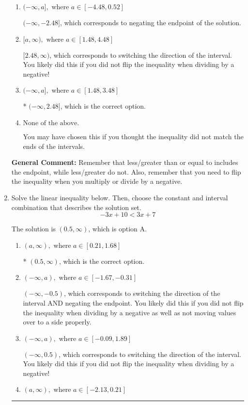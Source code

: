 \documentclass{extbook}[14pt]
\newcommand{\litem}[1]{\item #1

\rule{\textwidth}{0.4pt}}
\begin{document}
\begin{enumerate}
{\begin{enumerate}[label=\Alph*.]
 $[-2.48, \infty)$, which corresponds to switching the direction of the interval AND negating the endpoint. You likely did this if you did not flip the inequality when dividing by a negative as well as not moving values over to a side properly.
\item \( (-\infty, a], \text{ where } a \in [-4.48, 0.52] \)

 $(-\infty, -2.48]$, which corresponds to negating the endpoint of the solution.
\item \( [a, \infty), \text{ where } a \in [1.48, 4.48] \)

 $[2.48, \infty)$, which corresponds to switching the direction of the interval. You likely did this if you did not flip the inequality when dividing by a negative!
\item \( (-\infty, a], \text{ where } a \in [1.48, 3.48] \)

* $(-\infty, 2.48]$, which is the correct option.
\item \( \text{None of the above}. \)

You may have chosen this if you thought the inequality did not match the ends of the intervals.
\end{enumerate}

\textbf{General Comment:} Remember that less/greater than or equal to includes the endpoint, while less/greater do not. Also, remember that you need to flip the inequality when you multiply or divide by a negative.
}
\litem{
Solve the linear inequality below. Then, choose the constant and interval combination that describes the solution set.
\[ -3x + 10 < 3x + 7 \]

The solution is \( (0.5, \infty) \), which is option A.\begin{enumerate}[label=\Alph*.]
\item \( (a, \infty), \text{ where } a \in [0.21, 1.68] \)

* $(0.5, \infty)$, which is the correct option.
\item \( (-\infty, a), \text{ where } a \in [-1.67, -0.31] \)

 $(-\infty, -0.5)$, which corresponds to switching the direction of the interval AND negating the endpoint. You likely did this if you did not flip the inequality when dividing by a negative as well as not moving values over to a side properly.
\item \( (-\infty, a), \text{ where } a \in [-0.09, 1.89] \)

 $(-\infty, 0.5)$, which corresponds to switching the direction of the interval. You likely did this if you did not flip the inequality when dividing by a negative!
\item \( (a, \infty), \text{ where } a \in [-2.13, 0.21] \)


\end{enumerate}}
\end{enumerate}
\end{document}
